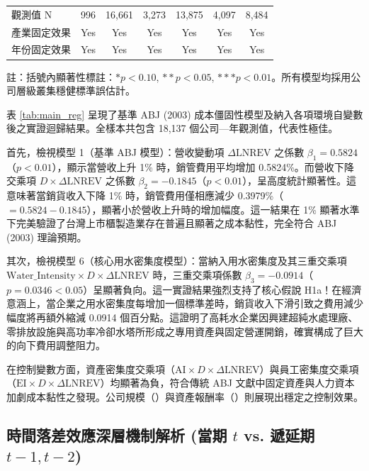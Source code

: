 \documentclass[12pt,a4paper]{article}
\begin{document}
\begin{table}[H]
\begin{threeparttable}
\begin{tabular}{lcccccc}
觀測值 N & 996 & 16,661 & 3,273 & 13,875 & 4,097 & 8,484 \\
產業固定效果 & Yes & Yes & Yes & Yes & Yes & Yes \\
年份固定效果 & Yes & Yes & Yes & Yes & Yes & Yes \\
\bottomrule
\end{tabular}
\begin{tablenotes}
\small
\item 註：括號內顯著性標註：$* p < 0.10$, $** p < 0.05$, $*** p < 0.01$。所有模型均採用公司層級叢集穩健標準誤估計。
\end{tablenotes}
\end{threeparttable}
\end{table}

表 \ref{tab:main_reg} 呈現了基準 ABJ (2003) 成本僵固性模型及納入各項環境自變數後之實證迴歸結果。全樣本共包含 18,137 個公司—年觀測值，代表性極佳。

首先，檢視模型 1（基準 ABJ 模型）：營收變動項 $\Delta\text{LNREV}$ 之係數 $\beta_1 = 0.5824$（$p < 0.01$），顯示當營收上升 1\% 時，銷管費用平均增加 0.5824\%。而營收下降交乘項 $D \times \Delta\text{LNREV}$ 之係數 $\beta_2 = -0.1845$（$p < 0.01$），呈高度統計顯著性。這意味著當銷貨收入下降 1\% 時，銷管費用僅相應減少 0.3979\%（$= 0.5824 - 0.1845$），顯著小於營收上升時的增加幅度。這一結果在 1\% 顯著水準下完美驗證了台灣上市櫃製造業存在普遍且顯著之成本黏性，完全符合 ABJ (2003) 理論預期。

其次，檢視模型 6（核心用水密集度模型）：當納入用水密集度及其三重交乘項 $\text{Water\_Intensity} \times D \times \Delta\text{LNREV}$ 時，三重交乘項係數 $\beta_3 = -0.0914$（$p = 0.0346 < 0.05$）呈顯著負向。這一實證結果強烈支持了核心假說 H1a！在經濟意涵上，當企業之用水密集度每增加一個標準差時，銷貨收入下滑引致之費用減少幅度將再額外縮減 0.0914 個百分點。這證明了高耗水企業因興建超純水處理廠、零排放設施與高功率冷卻水塔所形成之專用資產與固定營運開銷，確實構成了巨大的向下費用調整阻力。

在控制變數方面，資產密集度交乘項（$\text{AI} \times D \times \Delta\text{LNREV}$）與員工密集度交乘項（$\text{EI} \times D \times \Delta\text{LNREV}$）均顯著為負，符合傳統 ABJ 文獻中固定資產與人力資本加劇成本黏性之發現。公司規模（）與資產報酬率（）則展現出穩定之控制效果。

\subsection{時間落差效應深層機制解析 (當期 $t$ vs. 遞延期 $t-1, t-2$)}
\end{document}
